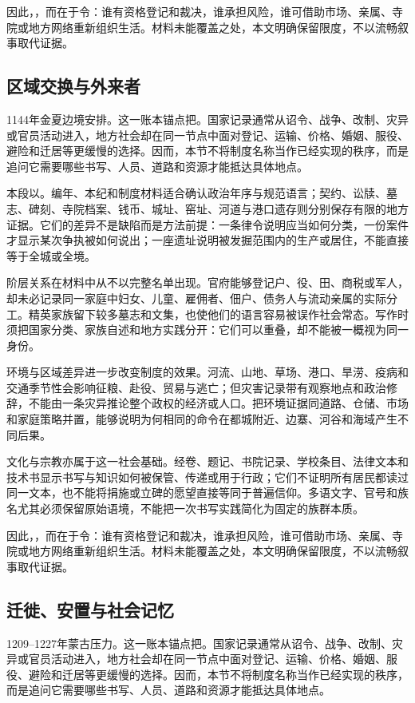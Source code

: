 因此，，而在于令：谁有资格登记和裁决，谁承担风险，谁可借助市场、亲属、寺院或地方网络重新组织生活。材料未能覆盖之处，本文明确保留限度，不以流畅叙事取代证据。

\subsection{区域交换与外来者}

1144年金夏边境安排。这一账本锚点把。国家记录通常从诏令、战争、改制、灾异或官员活动进入，地方社会却在同一节点中面对登记、运输、价格、婚姻、服役、避险和迁居等更缓慢的选择。因而，本节不将制度名称当作已经实现的秩序，而是追问它需要哪些书写、人员、道路和资源才能抵达具体地点。

本段以。编年、本纪和制度材料适合确认政治年序与规范语言；契约、讼牍、墓志、碑刻、寺院档案、钱币、城址、窑址、河道与港口遗存则分别保存有限的地方证据。它们的差异不是缺陷而是方法前提：一条律令说明应当如何分类，一份案件才显示某次争执被如何说出；一座遗址说明被发掘范围内的生产或居住，不能直接等于全城或全境。

阶层关系在材料中从不以完整名单出现。官府能够登记户、役、田、商税或军人，却未必记录同一家庭中妇女、儿童、雇佣者、佃户、债务人与流动亲属的实际分工。精英家族留下较多墓志和文集，也使他们的语言容易被误作社会常态。写作时须把国家分类、家族自述和地方实践分开：它们可以重叠，却不能被一概视为同一身份。

环境与区域差异进一步改变制度的效果。河流、山地、草场、港口、旱涝、疫病和交通季节性会影响征粮、赴役、贸易与逃亡；但灾害记录带有观察地点和政治修辞，不能由一条灾异推论整个政权的经济或人口。把环境证据同道路、仓储、市场和家庭策略并置，能够说明为何相同的命令在都城附近、边寨、河谷和海域产生不同后果。

文化与宗教亦属于这一社会基础。经卷、题记、书院记录、学校条目、法律文本和技术书显示书写与知识如何被保管、传递或用于行政；它们不证明所有居民都读过同一文本，也不能将捐施或立碑的愿望直接等同于普遍信仰。多语文字、官号和族名尤其必须保留原始语境，不能把一次书写实践简化为固定的族群本质。

因此，，而在于令：谁有资格登记和裁决，谁承担风险，谁可借助市场、亲属、寺院或地方网络重新组织生活。材料未能覆盖之处，本文明确保留限度，不以流畅叙事取代证据。

\subsection{迁徙、安置与社会记忆}

1209--1227年蒙古压力。这一账本锚点把。国家记录通常从诏令、战争、改制、灾异或官员活动进入，地方社会却在同一节点中面对登记、运输、价格、婚姻、服役、避险和迁居等更缓慢的选择。因而，本节不将制度名称当作已经实现的秩序，而是追问它需要哪些书写、人员、道路和资源才能抵达具体地点。

